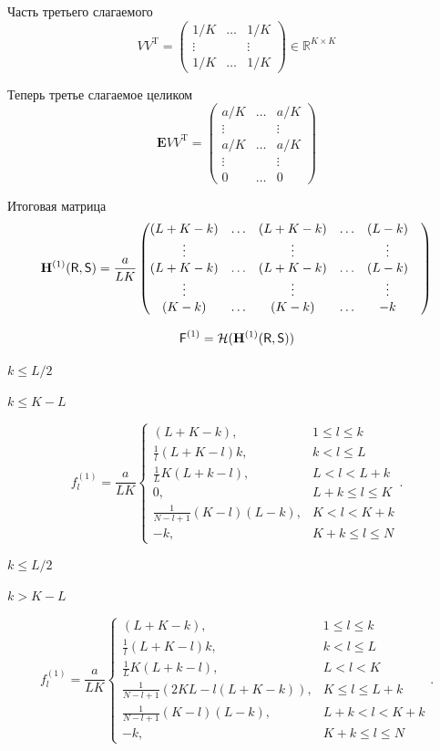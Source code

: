 \documentclass[specialist,
               substylefile = spbu.rtx,
               subf,href,colorlinks=true, 12pt]{disser}
\begin{document}
Часть третьего слагаемого
$$V V^{\mathrm{T}} = \begin{pmatrix}
	1/K & \ldots & 1/K\\
	\vdots & & \vdots\\
	1/K &   \ldots &  1/K
\end{pmatrix}\in \mathbb{R}^{K \times K}$$

Теперь третье слагаемое целиком
$$\mathbf{E} V V^{\mathrm{T}} = \begin{pmatrix}
	a/K &  \ldots & a/K\\
	\vdots & & \vdots\\
	a/K &  \ldots & a/K\\
	\vdots & & \vdots\\
	0 & \ldots & 0
\end{pmatrix}$$

Итоговая матрица
$$\mathbf{H}^{(1)}(\textsf{R}, \textsf{S}) = \frac{a}{LK}\begin{pmatrix}
	(L + K - k) & \ldots & (L + K - k) & \ldots & (L - k)\\
	\vdots & & \vdots & & \vdots \\
	(L + K - k) & \ldots & (L + K - k) & \ldots & (L - k) & \\
	\vdots & & \vdots & & \vdots \\
	(K - k) & \ldots & (K - k) & \ldots & -k \\
\end{pmatrix}$$

$$\textsf{F}^{(1)} = \mathcal{H}(\mathbf{H}^{(1)}(\textsf{R}, \textsf{S}))$$

$k \leq L/2$

$k \leq K - L$

$$f^{(1)}_l = \frac{a}{{LK}}
\begin{cases}
	(L + K - k), & \text{$1 \leq l \leq k$}\\
	\frac{1}{l}(L + K - l)k, & \text{$k < l \leq L$}\\
	\frac{1}{L}K(L + k - l), &\text{$L < l < L + k$}\\
	0, &\text{$L + k \leq l \leq K$}\\
	\frac{1}{N - l + 1}(K - l)(L - k), &\text{$K < l < K + k$}\\
	-k, &\text{$K + k \leq l \leq N $}
\end{cases}.
$$

$k \leq L/2$

$k > K - L$

$$f^{(1)}_l = \frac{a}{{LK}}
\begin{cases}
	(L + K - k), & \text{$1 \leq l \leq k$}\\
	\frac{1}{l}(L + K - l)k, & \text{$k < l \leq L$}\\
	\frac{1}{L}K(L + k- l), &\text{$L < l < K$}\\
	\frac{1}{N - l + 1}(2KL - l(L + K - k)), &\text{$K \leq l \leq L + k$}\\
	\frac{1}{N - l + 1}( K - l)(L - k), &\text{$L + k < l < K + k$}\\
	-k, &\text{$K + k \leq l \leq N$}
\end{cases}.
$$
\end{document}
